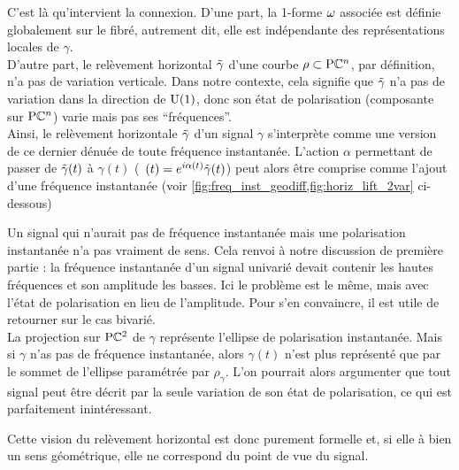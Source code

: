 C'est là qu'intervient la connexion. D'une part, la 1-forme $\omega$ associée est définie globalement sur le fibré, autrement dit, elle est indépendante des représentations locales de $\gamma$.
\\
D'autre part, le relèvement horizontal $\Tilde{\gamma}$ d'une courbe $\rho\subset\text{\normalfont P}\mathbb{C}^{n}$, par définition, n'a pas de variation verticale. Dans notre contexte, cela signifie que $\Tilde{\gamma}$ n'a pas de variation dans la direction de $\text{\normalfont U}(1)$, donc son état de polarisation (composante sur $\text{\normalfont P}\mathbb{C}^{n}$) varie mais pas ses ``fréquences''.
\\
Ainsi, le relèvement horizontale $\Tilde{\gamma}$ d'un signal $\gamma$ s'interprète comme une version de ce dernier dénuée de toute fréquence instantanée.
L'action $\alpha$ permettant de passer de $\Tilde{\gamma}(t)$ à $\gamma(t)$ (\ie~$(t) = e^{i\alpha(t)} \Tilde{\gamma}(t)$) peut alors être comprise comme l'ajout d'une fréquence instantanée (voir \cref{fig:freq_inst_geodiff,fig:horiz_lift_2var} ci-dessous)	
\\

\begin{remarque}
	Un signal qui n'aurait pas de fréquence instantanée mais une polarisation instantanée n'a pas vraiment de sens. 
	Cela renvoi à notre discussion de première partie : la fréquence instantanée d'un signal univarié devait contenir les hautes fréquences et son amplitude les basses.
	Ici le problème est le même, mais avec l'état de polarisation en lieu de l’amplitude. Pour s'en convaincre, il est utile de retourner sur le cas bivarié.
	\\
	La projection sur $\text{\normalfont P}\mathbb{C}^{2}$ de $\gamma$ représente l'ellipse de polarisation instantanée. 
	Mais si $\gamma$ n'as pas de fréquence instantanée, alors $\gamma(t)$ n'est plus représenté que par le sommet de l’ellipse paramétrée par $\rho_\gamma$. 
	L'on pourrait alors argumenter que tout signal peut être décrit par la seule variation de son état de polarisation, ce qui est parfaitement inintéressant.
	
	Cette vision du relèvement horizontal est donc purement formelle et, si elle à bien un sens géométrique, elle ne correspond du point de vue du signal.
\end{remarque}
\skipl

